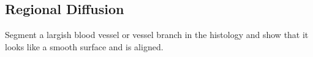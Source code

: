     \begin{figure}
      \centering
      \caption{}
      \label{fig:whole_positive_y_diffused}
    \end{figure}

    \begin{figure}
      \centering
      \caption{}
      \label{fig:whole_positive_z_diffused}
    \end{figure}
  
  \subsection{Regional Diffusion} %
  \label{sub:regional_diffusion}
    Segment a largish blood vessel or vessel branch in the histology and show that it looks like a smooth surface and is aligned. 

